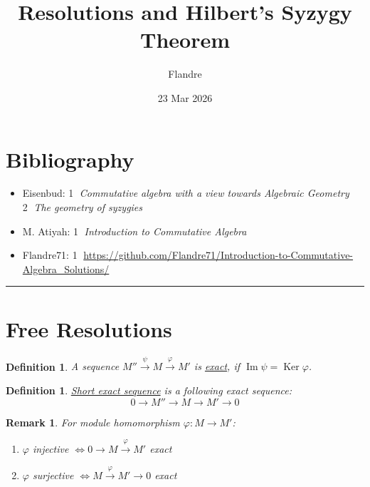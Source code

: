 \documentclass[11pt]{article}
\title{Resolutions and Hilbert's Syzygy Theorem}
\author{Flandre}
\date{23 Mar 2026}
\DeclareMathOperator{\Ker}{Ker}
\DeclareMathOperator{\ImOp}{Im} %
\newtheorem{definition}[theorem]{Definition}
\newtheorem{remark}[theorem]{Remark}
\begin{document}
\maketitle

\section*{Bibliography}
\begin{itemize}
    \item[] Eisenbud: 
    \textcircled{1} \textit{Commutative algebra with a view towards Algebraic Geometry} \\
    \textcircled{2} \textit{The geometry of syzygies}
    \item[] M. Atiyah: \textcircled{1} \textit{Introduction to Commutative Algebra}
    \item[] Flandre71: \textcircled{1} \url{https://github.com/Flandre71/Introduction-to-Commutative-Algebra_Solutions/}
\end{itemize}

\renewcommand{\contentsname}{Content}
\tableofcontents

\vspace{1em}
\hrule
\vspace{1em}

\section{Free Resolutions}

\begin{definition}
    A sequence $M'' \xrightarrow{\psi} M \xrightarrow{\varphi} M'$ is \underline{exact}, if $\ImOp \psi = \Ker \varphi$.
\end{definition}

\begin{definition}
    \underline{Short exact sequence} is a following exact sequence:
    $$ 0 \to M'' \to M \to M' \to 0 $$
\end{definition}

\begin{remark}
    For module homomorphism $\varphi: M \to M'$:
    \begin{enumerate}
        \item[i)] $\varphi$ injective $\iff 0 \to M \xrightarrow{\varphi} M'$ exact
        \item[ii)] $\varphi$ surjective $\iff M \xrightarrow{\varphi} M' \to 0$ exact
    \end{enumerate}
\end{remark}
\end{document}
